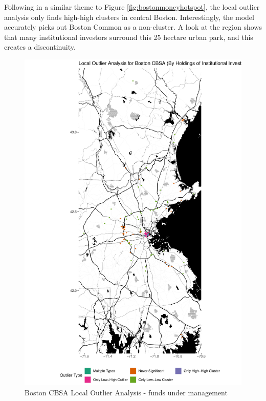 Following in a similar theme to Figure \ref{fig:bostonmoneyhotspot}, the local outlier analysis only finds high-high clusters in central Boston. Interestingly, the model accurately picks out Boston Common as a non-cluster.  A look at the region shows that many institutional investors surround this 25 hectare urban park, and this creates a discontinuity.  

\begin{figure}
	\centering
	\includegraphics[width=1\linewidth]{Figures/ChapterIV/Bos_Money_LO}
	\caption[Boston CBSA Local Outlier Analysis - Funds Under Management 2013-2018]{Boston CBSA Local Outlier Analysis - funds under management}
	\label{fig:bostonlocaloutlier}
\end{figure}


